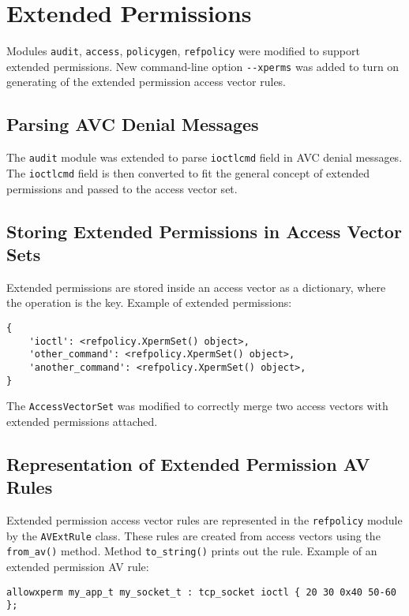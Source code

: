 \section{Extended Permissions}
Modules \texttt{audit}, \texttt{access}, \texttt{policygen}, \texttt{refpolicy}
were modified to support extended permissions. New command-line option
\texttt{-{}-xperms} was added to turn on generating of the extended permission
access vector rules.

\subsection{Parsing AVC Denial Messages}
The \texttt{audit} module was extended to parse \texttt{ioctlcmd} field in AVC
denial messages. The \texttt{ioctlcmd} field is then converted to fit the
general concept of extended permissions and passed to the access vector set.

\subsection{Storing Extended Permissions in Access Vector Sets}
Extended permissions are stored inside an access vector as a dictionary, where
the operation is the key. Example of extended permissions:
\begin{lstlisting}
{
    'ioctl': <refpolicy.XpermSet() object>,
    'other_command': <refpolicy.XpermSet() object>,
    'another_command': <refpolicy.XpermSet() object>,
}
\end{lstlisting}
The \texttt{AccessVectorSet} was modified to correctly merge two access vectors
with extended permissions attached.

\subsection{Representation of Extended Permission AV Rules}
Extended permission access vector rules are represented in the
\texttt{refpolicy} module by the \texttt{AVExtRule} class. These rules are
created from access vectors using the \texttt{from\_av()} method. Method
\texttt{to\_string()} prints out the rule. Example of an extended permission AV
rule:
\begin{lstlisting}
allowxperm my_app_t my_socket_t : tcp_socket ioctl { 20 30 0x40 50-60 };
\end{lstlisting}

